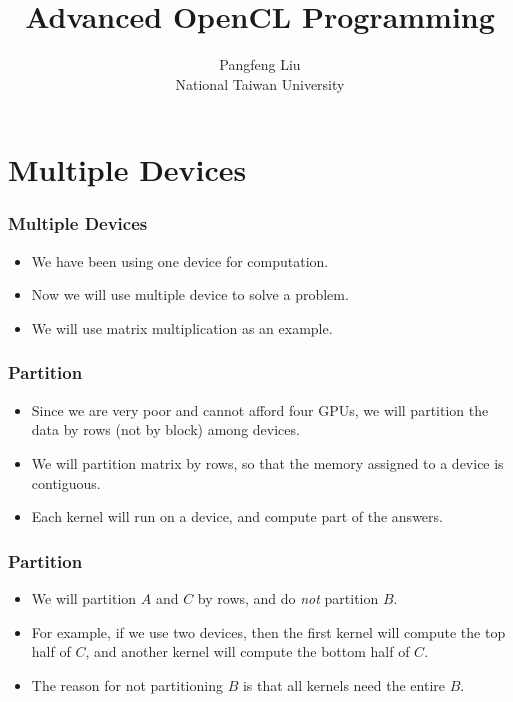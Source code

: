 \documentclass{beamer}
\begin{document}
\title{Advanced OpenCL Programming}

\author{Pangfeng Liu \\ National Taiwan University}

\begin{frame}
  \titlepage
\end{frame}


\section{Multiple Devices}

\begin{frame}
  \frametitle{Multiple Devices}
  \begin{itemize}
    \item We have been using one device for computation. 
    \item Now we will use multiple device to solve a problem.
    \item We will use matrix multiplication as an example.
  \end{itemize}
\end{frame}

\begin{frame}
  \frametitle{Partition}
  \begin{itemize}
    \item Since we are very poor and cannot afford four GPUs, we will
      partition the data by rows (not by block) among devices.  
    \item We will partition matrix by rows, so that the memory
      assigned to a device is contiguous.
    \item Each kernel will run on a device, and compute part of the
      answers.
  \end{itemize}
\end{frame}

\begin{frame}
  \frametitle{Partition}
  \begin{itemize}
    \item We will partition $A$ and $C$ by rows, and do {\em not}
      partition $B$.
    \item For example, if we use two devices, then the first kernel
      will compute the top half of $C$, and another kernel will
      compute the bottom half of $C$.
      \item The reason for not partitioning $B$ is that all kernels
        need the entire $B$.
  \end{itemize}
\end{frame}
\end{document}
